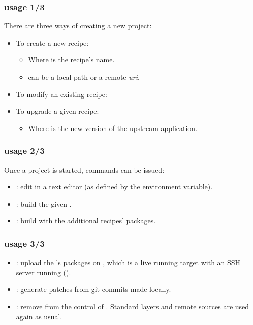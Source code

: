 \begin{frame}
  \frametitle{ usage 1/3}
  There are three ways of creating a new  project:
  \begin{itemize}
    \item To create a new recipe:
      \begin{itemize}
        \item Where  is the recipe's name.
        \item {} can be a local path or a remote {\em
          uri}.
      \end{itemize}
    \item To modify an existing recipe: 
    \item To upgrade a given recipe:
      \begin{itemize}
        \item Where  is the new version of the upstream
          application.
      \end{itemize}
  \end{itemize}
\end{frame}

\begin{frame}
  \frametitle{ usage 2/3}
  Once a  project is started, commands can be issued:
  \begin{itemize}
    \item {}: edit  in a text
      editor (as defined by the  environment variable).
    \item {}: build the given
      .
    \item {}: build  with
      the additional  recipes' packages.
  \end{itemize}
\end{frame}

\begin{frame}
  \frametitle{ usage 3/3}
  \begin{itemize}
    \item {}: upload the
      's packages on , which is a live
      running target with an SSH server running ().
    \item {}: generate patches from
      git commits made locally.
    \item {}: remove  from the
      control of . Standard layers and remote sources
      are used again as usual.
  \end{itemize}
\end{frame}


